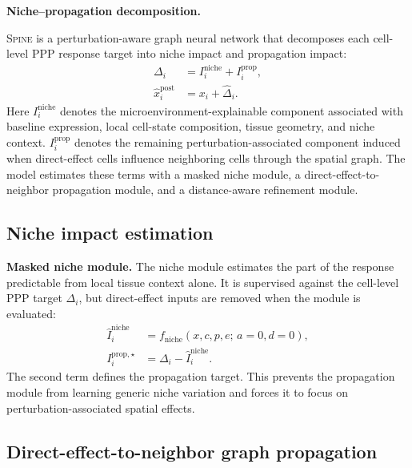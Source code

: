 \documentclass[sigconf,review,balance=false]{acmart}
\newcommand{\methodname}{\textsc{Spine}\xspace}
\begin{document}
\noindent\textbf{Niche--propagation decomposition.}\par\noindent
\methodname{} is a perturbation-aware graph neural network that decomposes each cell-level PPP response target into niche impact and propagation impact:
\begin{equation}
\label{eq:niche_prop_decomposition}
\begin{aligned}
\Delta_i
&= I_i^{\mathrm{niche}} + I_i^{\mathrm{prop}},\\
\widehat x_i^{\mathrm{post}}
&= x_i+\widehat\Delta_i .
\end{aligned}
\end{equation}
Here $I_i^{\mathrm{niche}}$ denotes the microenvironment-explainable component associated with baseline expression, local cell-state composition, tissue geometry, and niche context. $I_i^{\mathrm{prop}}$ denotes the remaining perturbation-associated component induced when direct-effect cells influence neighboring cells through the spatial graph. The model estimates these terms with a masked niche module, a direct-effect-to-neighbor propagation module, and a distance-aware refinement module.

\subsection{Niche impact estimation}
\label{sec:method_niche_impact}

\noindent\textbf{Masked niche module.}
The niche module estimates the part of the response predictable from local tissue context alone. It is supervised against the cell-level PPP target $\Delta_i$, but direct-effect inputs are removed when the module is evaluated:
\begin{equation}
\label{eq:niche_module_target}
\begin{aligned}
\widehat I_i^{\mathrm{niche}}
&= f_{\mathrm{niche}}(x,c,p,e;\,a=0,d=0),\\
I_i^{\mathrm{prop},\star}
&= \Delta_i-\widehat I_i^{\mathrm{niche}} .
\end{aligned}
\end{equation}
The second term defines the propagation target. This prevents the propagation module from learning generic niche variation and forces it to focus on perturbation-associated spatial effects.

\subsection{Direct-effect-to-neighbor graph propagation}
\label{sec:method_graph_propagation}
\end{document}
